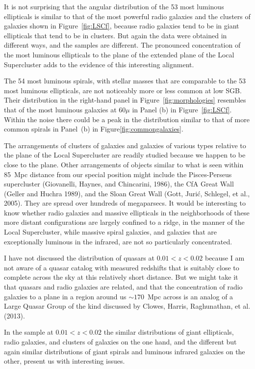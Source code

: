 \documentclass[fleqn,usenatbib]{mnras}
\begin{document}
It is not surprising that the angular distribution of the 53 most luminous ellipticals is similar to that of the most powerful radio galaxies and the clusters of galaxies shown in Figure~\ref{fig:LSCf}, because radio galaxies tend to be in giant ellipticals that tend to be in clusters. But again the data were obtained in different ways, and the samples are different. The pronounced concentration of the most luminous ellipticals to the plane of the extended plane of the Local Supercluster adds to the evidence of this interesting alignment. 

The 54 most luminous spirals, with stellar masses that are comparable to the 53 most luminous ellipticals, are not noticeably more or less common at low SGB. Their distribution in the right-hand panel in Figure~\ref{fig:morphologies} resembles that of the most luminous galaxies at $60\mu$ in Panel (b) in Figure~\ref{fig:LSCf}. Within the noise there could be a peak in the distribution similar to that of more common spirals in Panel~(b) in Figure\ref{fig:commongalaxies}.

The arrangements of  clusters of galaxies and galaxies of various types relative to the plane of the Local Supercluster are readily studied because we happen to be close to the plane. Other arrangements of objects similar to what is seen within 85~Mpc distance from our special position might include the Pisces-Perseus supercluster (Giovanelli, Haynes, and Chincarini, 1986), the CfA Great Wall (Geller and Huchra 1989), and the Sloan Great Wall (Gott, Juri{\'c}, Schlegel, et al., 2005). They are spread over hundreds of megaparsecs. It would be interesting to know whether radio galaxies and massive ellipticals in the neighborhoods of these more distant configurations are largely confined to a ridge, in the manner of the Local Supercluster, while massive spiral galaxies, and galaxies that are exceptionally luminous in the infrared, are not so particularly concentrated. 

I have not discussed the distribution of quasars at $0.01<z<0.02$ because I am not aware of a quasar catalog with measured redshifts that is suitably close to complete across the sky at this relatively short distance. But we might take it that quasars and radio galaxies are related, and that the concentration of radio galaxies to a plane in a region around us $\sim 170$~Mpc across is an analog of a Large Quasar Group of the kind discussed by Clowes, Harris, Raghunathan, et al. (2013). 

In the sample at $0.01 < z < 0.02$ the similar distributions of giant ellipticals, radio galaxies, and clusters of galaxies on the one  hand, and the different but again similar distributions of giant spirals and luminous infrared galaxies on the other, present us with interesting issues.
\end{document}
